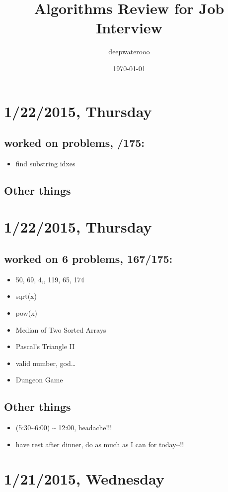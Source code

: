 \documentclass[9pt,b5paper]{article}
\author{deepwaterooo}
\date{\today}
\title{Algorithms Review for Job Interview}
\begin{document}
\maketitle
\tableofcontents


\section{1/22/2015, Thursday}
\label{sec-1}
\subsection{worked on  problems, /175:}
\label{sec-1-1}
\begin{itemize}
\item find substring idxes
\end{itemize}
\subsection{Other things}
\label{sec-1-2}
\section{1/22/2015, Thursday}
\label{sec-2}
\subsection{worked on 6 problems, 167/175:}
\label{sec-2-1}
\begin{itemize}
\item 50, 69, 4,, 119, 65, 174
\item sqrt(x)
\item pow(x)
\item Median of Two Sorted Arrays
\item Pascal's Triangle II
\item valid number, god\ldots{}
\item Dungeon Game
\end{itemize}
\subsection{Other things}
\label{sec-2-2}
\begin{itemize}
\item (5:30\textasciitilde{}6:00) \textasciitilde{} 12:00, headache!!!
\item have rest after dinner, do as much as I can for today\textasciitilde{}!!
\end{itemize}
\section{1/21/2015, Wednesday}
\label{sec-3}
\end{document}
